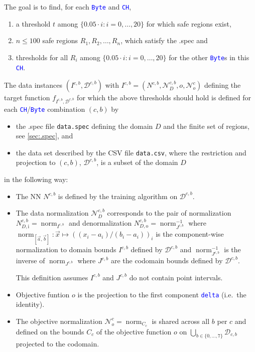 \documentclass[a4paper,parskip=half]{article} %
\newcommand*\cmdstyle\texttt
\newcommand*\file\cmdstyle
\newcommand*\literalColor{blue}
\newcommand*\literal[1]{\textcolor{\literalColor}{\cmdstyle{#1}}}
\begin{document}
The goal is to find, for each \literal{Byte} and \literal{CH},
\begin{enumerate}
\def\labelenumi{(\alph{enumi})}
\item a threshold $t$ among $\{0.05\cdot i:i=0,\ldots,20\}$ for which safe
	regions exist,
\item $n\leq 100$ safe regions $R_1,R_2,\ldots,R_n$, which satisfy the .spec and
\item thresholds for all $R_i$ among $\{0.05\cdot i:i=0,\ldots,20\}$ for the
	other \literal{Byte}s in this \literal{CH}.
\end{enumerate}
The data instances $(I^{c,b},\mathcal D^{c,b})$ with
$I^{c,b}=(N^{c,b},\mathcal N_D^{c,b},o,\mathcal N_o^c)$
defining the target function $f_{I^{c,b},\mathcal D^{c,b}}$ for which the
above thresholds should hold is defined for each \literal{CH}/\literal{Byte}
combination $(c,b)$ by
\begin{itemize}
\item the .spec file \file{data.spec} defining the domain $D$
	and the finite set of regions, see \cref{sec:.spec}, and
\item the data set
	described by the CSV file \file{data.csv}, where
	the restriction and projection to $(c,b)$, $\mathcal D^{c,b}$,
	is a subset of the domain $D$
\end{itemize}
in the following way:
\begin{itemize}
\item
	The NN $N^{c,b}$ is defined by the training algorithm on
	$\mathcal D^{c,b}$.
\item
	The data normalization $\mathcal N_D^{c,b}$ corresponds to the pair of
	normalization $N_{D,\mathrm i}^{c,b}=\operatorname{norm}_{I^{c,b}}$
	and denormalization
	$N_{D,\mathrm o}^{c,b}=\operatorname{norm}_{J^{c,b}}^{-1}$ where
	$\operatorname{norm}_{[\vec a,\vec b]}:\vec x\mapsto ((x_i-a_i)/(b_i-a_i))_i$
	is the component-wise normalization to domain bounds $I^{c,b}$
	defined by $\mathcal D^{c,b}$
	and $\operatorname{norm}_{J^{c,b}}^{-1}$ is the inverse of
	$\operatorname{norm}_{J^{c,b}}$
	where $J^{c,b}$ are the codomain bounds defined by $\mathcal D^{c,b}$.

	This definition assumes $I^{c,b}$ and $J^{c,b}$ do not contain
	point intervals.
\item
	Objective funtion $o$ is the projection to the first component
	\literal{delta} (i.e.\ the identity).
\item
	The objective normalization $\mathcal N_o^c=\operatorname{norm}_{C_c}$
	is shared across all $b$ per $c$ and defined on the bounds $C_c$ of the
	objective function $o$ on $\bigcup_{b\in\{0,\ldots,7\}}\mathcal D_{c,b}$
	projected to the codomain.
\end{itemize}
\end{document}
